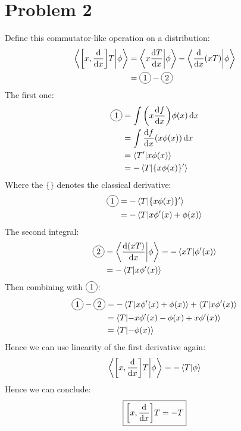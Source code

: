 \documentclass[12pt]{article}
\newcommand*\circled[1]{\tikz[baseline=(char.base)]{
            \node[shape=circle,draw,inner sep=2pt] (char) {#1};}}
\begin{document}
\section*{Problem 2}
Define this commutator-like operation on a distribution:
\begin{align*}
  \ip{\comm{x}{\dv{x}}T}{\phi}&=\ip{x\dv{T}{x}}{\phi}-\ip{\dv{x}(xT)}{\phi}\\
  &=\circled{1}-\circled{2}
\end{align*}
The first one:
\begin{align*}
  \circled{1}&=\int\qty(x\dv{f}{x})\phi(x)\dd{x}\\
  &=\int\dv{f}{x}\qty(x\phi(x))\dd{x}\\
  &=\ip{T'}{x\phi(x)}\\
  &=-\ip{T}{\{x\phi(x)\}'}
\end{align*}
Where the $\{\}$ denotes the classical derivative:
\begin{align*}
  \circled{1}&=-\ip{T}{\{x\phi(x)\}'}\\
  &=-\ip{T}{x\phi'(x)+\phi(x)}
\end{align*}
The second integral:
\begin{align*}
  \circled{2}&=\ip{\dv{(xT)}{x}}{\phi}=-\ip{xT}{\phi'(x)}\\
  &=-\ip{T}{x\phi'(x)}
\end{align*}
Then combining with $\circled{1}$:
\begin{align*}
  \circled{1}-\circled{2}&=-\ip{T}{x\phi'(x)+\phi(x)}+\ip{T}{x\phi'(x)}\\
  &=\ip{T}{-x\phi'(x)-\phi(x)+x\phi'(x)}\\
  &=\ip{T}{-\phi(x)}
\end{align*}
Hence we can use linearity of the first derivative again:
\begin{align*}
  \ip{\comm{x}{\dv{x}}T}{\phi}=-\ip{T}{\phi}
\end{align*}
Hence we can conclude:
\begin{align}
  \boxed{\comm{x}{\dv{x}}T=-T}
\end{align}
\end{document}
